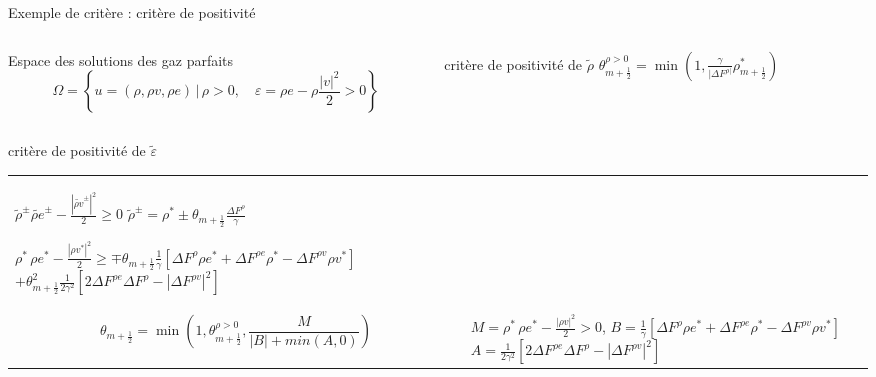 \begin{frame}{Exemple de critère : critère de positivité}
\begin{columns}

\begin{column}{0.55 \textwidth}
\begin{block}{Espace des solutions des gaz parfaits}
\begin{equation}
    \Omega = \left\{u=(\rho,\rho v,\rho e) \, \biggr \rvert \, \rho >0, \quad \varepsilon= \rho e - \rho \frac{|v|^2}{2} >0\right\}
\end{equation}
\end{block}
\end{column}

\begin{column}{0.35 \textwidth}
\begin{block}{critère de positivité de $\widetilde{\rho}$}
$\theta_{m+\frac{1}{2}}^{\rho>0} = \min \left(1, \frac{\gamma}{|\Delta F^{\rho|} } {\rho}_{m+\frac{1}{2}}^{*} \right)$
\end{block}
\end{column}

\end{columns}

\begin{block}{critère de positivité de $\widetilde{\varepsilon}$}
\begin{tabular}{p{6.2cm} p{6cm}}
$\widetilde{\rho}^{\pm} \widetilde{\rho e}^{\pm} - \frac{|\widetilde{\rho v}^{\pm}|^2}{2}  \geq 0 $ 
\hspace{1cm}$\widetilde{\rho}^{\pm} = \rho^* \pm \theta_{m+\frac{1}{2}} \frac{\Delta F^\rho}{\gamma} $

$\rho^* \, \rho e^* - \frac{|\rho v^* |^2}{2} \geq \mp \theta_{m+\frac{1}{2}} \frac{1}{\gamma}   \left[\Delta F^{\rho} \rho e^* + \Delta F^{\rho e} \rho^* - \Delta F^{\rho v} \rho v^* \right]$
\vspace{0.1cm}
\hspace{2cm}$+ \theta_{m+\frac{1}{2}}^2 \frac{1}{2\gamma^2}\left[2\Delta F^{\rho e}\Delta F^{\rho}- |\Delta F^{\rho v}|^2\right]$
\\
\begin{equation}
\theta_{m+\frac{1}{2}} = \min \left(1, \theta_{m+\frac{1}{2}}^{\rho>0}, \frac{M}{|B|+ min(A,0) } \right)
\end{equation}
&
\multirow{2}{6cm}{
$M = \rho^* \, \rho e^* - \frac{|\rho v|^2}{2}>0 $, 
$B= \frac{1}{\gamma}   \left[\Delta F^{\rho} \rho e^* + \Delta F^{\rho e} \rho^* - \Delta F^{\rho v} \rho v^* \right]$
$A = \frac{1}{2\gamma^2}\left[2\Delta F^{\rho e}\Delta F^{\rho}- |\Delta F^{\rho v}|^2\right]$ 
}
\end{tabular}
\end{block}

\end{frame}

